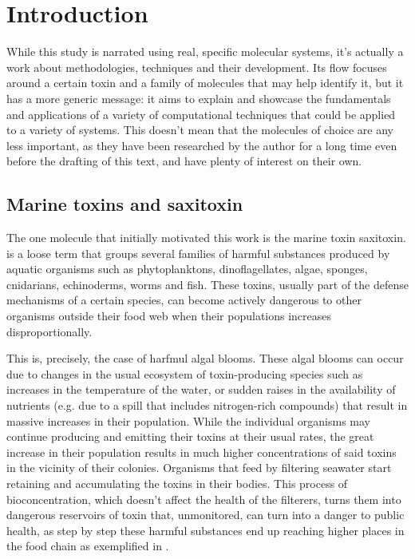 \chapter{Introduction}

While this study is narrated using real, specific molecular systems, it's actually a work about methodologies, techniques and their development.
Its flow focuses around a certain toxin and a family of molecules that may help identify it, but it has a more generic message: it aims to explain and showcase the fundamentals and applications of a variety of computational techniques that could be applied to a variety of systems.
This doesn't mean that the molecules of choice are any less important, as they have been researched by the author for a long time even before the drafting of this text, and have plenty of interest on their own.

\section{Marine toxins and saxitoxin}

The one molecule that initially motivated this work is the marine toxin saxitoxin.
 is a loose term that groups several families of harmful substances produced by aquatic organisms such as phytoplanktons, dinoflagellates, algae, sponges, cnidarians, echinoderms, worms and fish.
These toxins, usually part of the defense mechanisms of a certain species, can become actively dangerous to other organisms outside their food web when their populations increases disproportionally.

This is, precisely, the case of harfmul algal blooms.
These algal blooms can occur due to changes in the usual ecosystem of toxin-producing species such as increases in the temperature of the water, or sudden raises in the availability of nutrients (e.g. due to a spill that includes nitrogen-rich compounds) that result in massive increases in their population.\cite{michalak13,gobler17,chakraborty10}
While the individual organisms may continue producing and emitting their toxins at their usual rates, the great increase in their population results in much higher concentrations of said toxins in the vicinity of their colonies.
Organisms that feed by filtering seawater start retaining and accumulating the toxins in their bodies.\cite{oikawa05}
This process of bioconcentration, which doesn't affect the health of the filterers, turns them into dangerous reservoirs of toxin that, unmonitored, can turn into a danger to public health, as step by step these harmful substances end up reaching higher places in the food chain as exemplified in .

